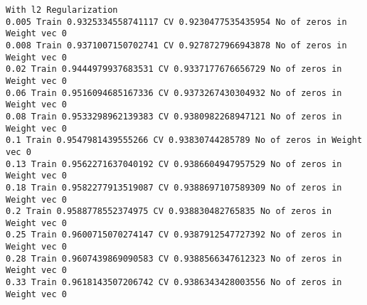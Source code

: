 \documentclass[11pt]{article}
\begin{document}
    \begin{Verbatim}[commandchars=\\\{\}]
With l2 Regularization
0.005 Train 0.9325334558741117 CV 0.9230477535435954 No of zeros in Weight vec 0
0.008 Train 0.9371007150702741 CV 0.9278727966943878 No of zeros in Weight vec 0
0.02 Train 0.9444979937683531 CV 0.9337177676656729 No of zeros in Weight vec 0
0.06 Train 0.9516094685167336 CV 0.9373267430304932 No of zeros in Weight vec 0
0.08 Train 0.9533298962139383 CV 0.9380982268947121 No of zeros in Weight vec 0
0.1 Train 0.9547981439555266 CV 0.93830744285789 No of zeros in Weight vec 0
0.13 Train 0.9562271637040192 CV 0.9386604947957529 No of zeros in Weight vec 0
0.18 Train 0.9582277913519087 CV 0.9388697107589309 No of zeros in Weight vec 0
0.2 Train 0.9588778552374975 CV 0.938830482765835 No of zeros in Weight vec 0
0.25 Train 0.9600715070274147 CV 0.9387912547727392 No of zeros in Weight vec 0
0.28 Train 0.9607439869090583 CV 0.9388566347612323 No of zeros in Weight vec 0
0.33 Train 0.9618143507206742 CV 0.9386343428003556 No of zeros in Weight vec 0

    \end{Verbatim}
\end{document}
